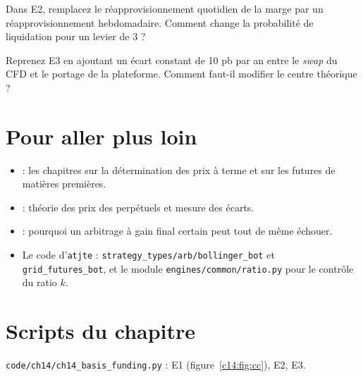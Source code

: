 \begin{exercise}[à coder]
Dans E2, remplacez le réapprovisionnement quotidien de la marge par un réapprovisionnement hebdomadaire. Comment change la probabilité de liquidation pour un levier de 3 ?
\end{exercise}

\begin{exercise}[à coder]
Reprenez E3 en ajoutant un écart constant de 10 pb par an entre le \emph{swap} du CFD et le portage de la plateforme. Comment faut-il modifier le centre théorique ?
\end{exercise}

\section{Pour aller plus loin}

\begin{toread}
\begin{itemize}[leftmargin=1.2em]
\item \citet{hull2022} : les chapitres sur la détermination des prix à terme et sur les futures de matières premières.
\item \citet{he2022perp} : théorie des prix des perpétuels et mesure des écarts.
\item \citet{shleifer1997} : pourquoi un arbitrage à gain final certain peut tout de même échouer.
\item Le code d'\texttt{atjte} \citep{atjte} : \texttt{strategy\_types/arb/bollinger\_bot} et \texttt{grid\_futures\_bot}, et le module \texttt{engines/common/ratio.py} pour le contrôle du ratio $k$.
\end{itemize}
\end{toread}

\section{Scripts du chapitre}
\noindent\texttt{code/ch14/ch14\_basis\_funding.py} : E1 (figure~\ref{c14:fig:cc}), E2, E3.
